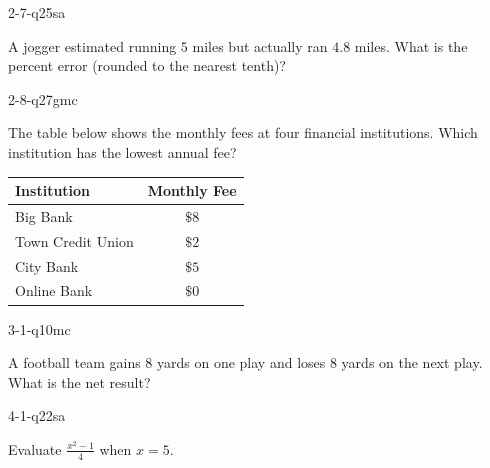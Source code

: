 \begin{practiceQuestion}{2-7-q25}{sa}
\begin{questionText}
A jogger estimated running $5$ miles but actually ran $4.8$ miles. What is the percent error (rounded to the nearest tenth)?
\end{questionText}
\end{practiceQuestion}

\begin{practiceQuestion}{2-8-q27}{gmc}
\begin{questionText}
The table below shows the monthly fees at four financial institutions. Which institution has the lowest annual fee?

\begin{center}
\begin{tabular}{|l|c|}
\hline
\textbf{Institution} & \textbf{Monthly Fee} \\
\hline
Big Bank & $\$8$ \\
\hline
Town Credit Union & $\$2$ \\
\hline
City Bank & $\$5$ \\
\hline
Online Bank & $\$0$ \\
\hline
\end{tabular}
\end{center}
\end{questionText}
\end{practiceQuestion}

\begin{practiceQuestion}{3-1-q10}{mc}
\begin{questionText}
A football team gains $8$ yards on one play and loses $8$ yards on the next play. What is the net result?
\end{questionText}
\end{practiceQuestion}

\begin{practiceQuestion}{4-1-q22}{sa}
\begin{questionText}
Evaluate $\frac{x^2 - 1}{4}$ when $x = 5$.
\end{questionText}
\end{practiceQuestion}

